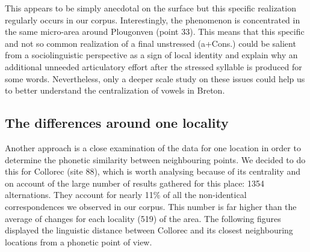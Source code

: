 \documentclass[output=paper]{LSP/langsci}
\begin{document}
\begin{table}
\label{tab:7}
\caption{Distribution of the different occurrences of (a+Cons.) according to the location investigated}
\end{table}

This appears to be simply anecdotal on the surface but this specific realization regularly occurs in our corpus. Interestingly, the phenomenon is concentrated in the same micro-area around Plougonven (point 33). This means that this specific and not so common realization of a final unstressed (a+Cons.) could be salient from a sociolinguistic perspective as a sign of local identity and explain why an additional unneeded articulatory effort after the stressed syllable is produced for some words. Nevertheless, only a deeper scale study on these issues could help us to better understand the centralization of vowels in Breton.

\subsection[The differences around one locality]{The differences around one locality}

Another approach is a close examination of the data for one location in order to determine the phonetic similarity between neighbouring points. We decided to do this for Collorec (site 88), which is worth analysing because of its centrality and on account of the large number of results gathered for this place: 1354 alternations. They account for nearly 11\% of all the non-identical correspondences we observed in our corpus. This number is far higher than the average of changes for each locality (519) of the area. The following figures displayed the linguistic distance between Collorec and its closest neighbouring locations from a phonetic point of view.
\end{document}
